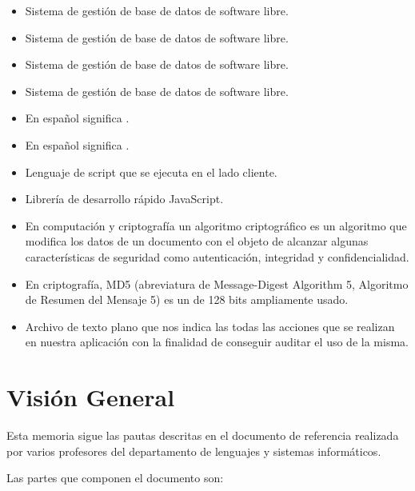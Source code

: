 \begin{itemize}
\item {} Sistema de gestión de base de datos de software libre.
\item {} Sistema de gestión de base de datos de software libre.
\item {} Sistema de gestión de base de datos de software libre.
\item {} Sistema de gestión de base de datos de software libre.
\item {} En español significa .
\item {} En español significa
  .
\item {} Lenguaje de script que se ejecuta en el lado
  cliente.
\item {} Librería de desarrollo rápido JavaScript.
\item {} En computación y criptografía un
  algoritmo criptográfico es un algoritmo que modifica los datos de un documento
  con el objeto de alcanzar algunas características de seguridad como
  autenticación, integridad y confidencialidad.
\item {} En criptografía, MD5 (abreviatura de
  Message-Digest Algorithm 5, Algoritmo de Resumen del Mensaje 5) es un
   de 128 bits ampliamente usado.
\item {} Archivo de texto plano que nos indica las todas las
  acciones que se realizan en nuestra aplicación con la finalidad de conseguir
  auditar el uso de la misma.


\end{itemize}

\section{Visión General}
Esta memoria sigue las pautas descritas en el documento de referencia
 realizada por varios profesores del departamento de lenguajes y
sistemas informáticos.

Las partes que componen el documento son:

